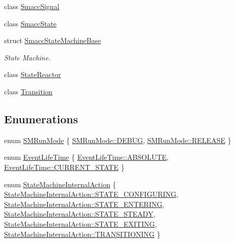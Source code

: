 \begin{DoxyCompactItemize}
class \hyperlink{classsmacc_1_1SmaccSignal}{Smacc\+Signal}
\item 
class \hyperlink{classsmacc_1_1SmaccState}{Smacc\+State}
\item 
struct \hyperlink{structsmacc_1_1SmaccStateMachineBase}{Smacc\+State\+Machine\+Base}
\begin{DoxyCompactList}\small\item\em State Machine. \end{DoxyCompactList}\item 
class \hyperlink{classsmacc_1_1StateReactor}{State\+Reactor}
\item 
class \hyperlink{classsmacc_1_1Transition}{Transition}
\end{DoxyCompactItemize}
\subsection*{Enumerations}
\begin{DoxyCompactItemize}
\item 
enum \hyperlink{namespacesmacc_a3e4f79486ea6ea6342dd3c712d16a4f6}{S\+M\+Run\+Mode} \{ \hyperlink{namespacesmacc_a3e4f79486ea6ea6342dd3c712d16a4f6adc30ec20708ef7b0f641ef78b7880a15}{S\+M\+Run\+Mode\+::\+D\+E\+B\+UG}, 
\hyperlink{namespacesmacc_a3e4f79486ea6ea6342dd3c712d16a4f6a7d649ef069df9885e382417c79f3d5cd}{S\+M\+Run\+Mode\+::\+R\+E\+L\+E\+A\+SE}
 \}
\item 
enum \hyperlink{namespacesmacc_a5063f47926ad2fe25120ed4b1e7b2c7e}{Event\+Life\+Time} \{ \hyperlink{namespacesmacc_a5063f47926ad2fe25120ed4b1e7b2c7ea3a0bc063b6db8cae0361657958be836f}{Event\+Life\+Time\+::\+A\+B\+S\+O\+L\+U\+TE}, 
\hyperlink{namespacesmacc_a5063f47926ad2fe25120ed4b1e7b2c7ea49b599d413671f16f08d0dd18243c294}{Event\+Life\+Time\+::\+C\+U\+R\+R\+E\+N\+T\+\_\+\+S\+T\+A\+TE}
 \}
\item 
enum \hyperlink{namespacesmacc_a0889aff43c93fe5285109819d2898144}{State\+Machine\+Internal\+Action} \{ \newline
\hyperlink{namespacesmacc_a0889aff43c93fe5285109819d2898144a32406d3560b9f36b3e6e3b84454e1be5}{State\+Machine\+Internal\+Action\+::\+S\+T\+A\+T\+E\+\_\+\+C\+O\+N\+F\+I\+G\+U\+R\+I\+NG}, 
\hyperlink{namespacesmacc_a0889aff43c93fe5285109819d2898144aef27ae3e54b805b81e1efacea3c02575}{State\+Machine\+Internal\+Action\+::\+S\+T\+A\+T\+E\+\_\+\+E\+N\+T\+E\+R\+I\+NG}, 
\hyperlink{namespacesmacc_a0889aff43c93fe5285109819d2898144aaefffb251a9a48e0e3274e9475d22749}{State\+Machine\+Internal\+Action\+::\+S\+T\+A\+T\+E\+\_\+\+S\+T\+E\+A\+DY}, 
\hyperlink{namespacesmacc_a0889aff43c93fe5285109819d2898144a22bd5bb7935dd66f181d92efc273951e}{State\+Machine\+Internal\+Action\+::\+S\+T\+A\+T\+E\+\_\+\+E\+X\+I\+T\+I\+NG}, 
\newline
\hyperlink{namespacesmacc_a0889aff43c93fe5285109819d2898144a5e174e130ee1847f37541ba5786207a3}{State\+Machine\+Internal\+Action\+::\+T\+R\+A\+N\+S\+I\+T\+I\+O\+N\+I\+NG}
 \}
\end{DoxyCompactItemize}
